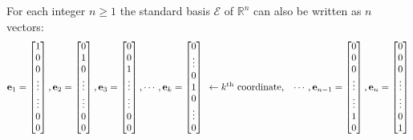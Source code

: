 \begin{remark}For each integer $n\geq 1$ the standard basis $\mathcal{E}$ 
of $\mathbb{R}^n$ can also be written as $n$ vectors:
\[
\vec{e}_{1}=\begin{bmatrix} 1 \\  0 \\ 0 \\ \vdots \\ \vdots \\ 0 \\ 0\end{bmatrix},
\vec{e}_{2}=\begin{bmatrix} 0 \\  1 \\ 0 \\ \vdots \\ \vdots \\ 0 \\ 0\end{bmatrix},
\vec{e}_{3}=\begin{bmatrix} 0 \\  0 \\ 1 \\ \vdots \\ \vdots \\ 0 \\ 0\end{bmatrix},
\cdots,
\vec{e}_k=\begin{bmatrix} 0 \\  \vdots \\ 0 \\ 1 \\ 0 \\ \vdots \\ 0 \end{bmatrix}
\begin{array}{l}
\phantom{0} \\  \phantom{\vdots} \\ \phantom{0} \\ \gets k^{\tiny{\text{th}}} 
\text{ coordinate, } \\ \phantom{0} \\ \phantom{\vdots} \\ \phantom{0} 
\end{array} 
\cdots,
\vec{e}_{n-1}=\begin{bmatrix} 0 \\  0 \\ 0 \\ \vdots \\ \vdots \\ 1 \\ 0\end{bmatrix},
\vec{e}_{n}=\begin{bmatrix} 0 \\  0 \\ 0 \\ \vdots\\ \vdots \\ 0 \\ 1\end{bmatrix}
\]
\end{remark}
